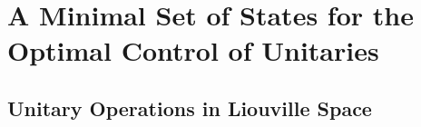 %

\section[A Minimal Set of States for the Opt.~Control of Unitaries]{A Minimal Set of States for the Optimal Control of Unitaries}

\label{sec:3st_oct}

\vspace{24pt}
\subsection{Unitary Operations in Liouville Space}

